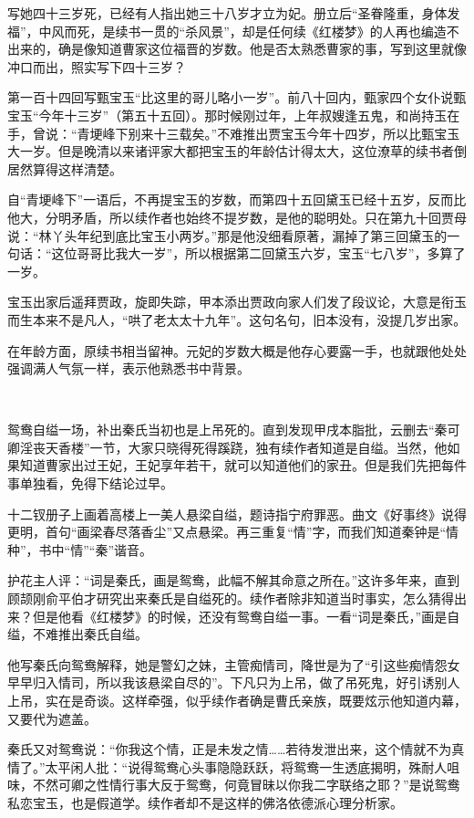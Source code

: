 \par 写她四十三岁死，已经有人指出她三十八岁才立为妃。册立后“圣眷隆重，身体发福”，中风而死，是续书一贯的“杀风景”，却是任何续《红楼梦》的人再也编造不出来的，确是像知道曹家这位福晋的岁数。他是否太熟悉曹家的事，写到这里就像冲口而出，照实写下四十三岁？
\par 第一百十四回写甄宝玉“比这里的哥儿略小一岁”。前八十回内，甄家四个女仆说甄宝玉“今年十三岁”（第五十五回）。那时候刚过年，上年叔嫂逢五鬼，和尚持玉在手，曾说：“青埂峰下别来十三载矣。”不难推出贾宝玉今年十四岁，所以比甄宝玉大一岁。但是晚清以来诸评家大都把宝玉的年龄估计得太大，这位潦草的续书者倒居然算得这样清楚。
\par 自“青埂峰下”一语后，不再提宝玉的岁数，而第四十五回黛玉已经十五岁，反而比他大，分明矛盾，所以续作者也始终不提岁数，是他的聪明处。只在第九十回贾母说：“林丫头年纪到底比宝玉小两岁。”那是他没细看原著，漏掉了第三回黛玉的一句话：“这位哥哥比我大一岁”，所以根据第二回黛玉六岁，宝玉“七八岁”，多算了一岁。
\par 宝玉出家后遥拜贾政，旋即失踪，甲本添出贾政向家人们发了段议论，大意是衔玉而生本来不是凡人，“哄了老太太十九年”。这句名句，旧本没有，没提几岁出家。
\par 在年龄方面，原续书相当留神。元妃的岁数大概是他存心要露一手，也就跟他处处强调满人气氛一样，表示他熟悉书中背景。
\par  
\par 鸳鸯自缢一场，补出秦氏当初也是上吊死的。直到发现甲戌本脂批，云删去“秦可卿淫丧天香楼”一节，大家只晓得死得蹊跷，独有续作者知道是自缢。当然，他如果知道曹家出过王妃，王妃享年若干，就可以知道他们的家丑。但是我们先把每件事单独看，免得下结论过早。
\par 十二钗册子上画着高楼上一美人悬梁自缢，题诗指宁府罪恶。曲文《好事终》说得更明，首句“画梁春尽落香尘”又点悬梁。再三重复“情”字，而我们知道秦钟是“情种”，书中“情”“秦”谐音。
\par 护花主人评：“词是秦氏，画是鸳鸯，此幅不解其命意之所在。”这许多年来，直到顾颉刚俞平伯才研究出来秦氏是自缢死的。续作者除非知道当时事实，怎么猜得出来？但是他看《红楼梦》的时候，还没有鸳鸯自缢一事。一看“词是秦氏，”画是自缢，不难推出秦氏自缢。
\par 他写秦氏向鸳鸯解释，她是警幻之妹，主管痴情司，降世是为了“引这些痴情怨女早早归入情司，所以我该悬梁自尽的”。下凡只为上吊，做了吊死鬼，好引诱别人上吊，实在是奇谈。这样牵强，似乎续作者确是曹氏亲族，既要炫示他知道内幕，又要代为遮盖。
\par 秦氏又对鸳鸯说：“你我这个情，正是未发之情……若待发泄出来，这个情就不为真情了。”太平闲人批：“说得鸳鸯心头事隐隐跃跃，将鸳鸯一生透底揭明，殊耐人咀味，不然可卿之性情行事大反于鸳鸯，何竟冒昧以你我二字联络之耶？”是说鸳鸯私恋宝玉，也是假道学。续作者却不是这样的佛洛依德派心理分析家。
